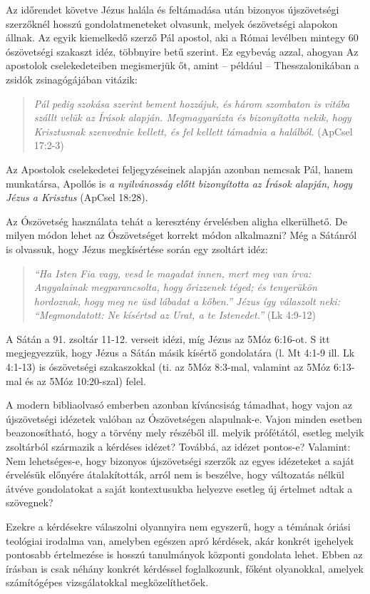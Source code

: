 \documentclass{article}
\begin{document}
Az időrendet követve Jézus halála és feltámadása után bizonyos újszövetségi szerzőknél hosszú gondolatmeneteket olvasunk,
melyek ószövetségi alapokon állnak. Az egyik kiemelkedő szerző Pál apostol, aki a Római levélben
mintegy 60 ószövetségi szakaszt idéz, többnyire betű szerint. Ez egybevág azzal, ahogyan
Az apostolok cselekedeteiben megismerjük őt, amint -- például -- Thesszalonikában a zsidók zsinagógájában
vitázik:
\begin{quote}
\textit{Pál pedig szokása szerint bement hozzájuk, és három szombaton is vitába
szállt velük az Írások alapján. Megmagyarázta és bizonyította nekik, hogy
Krisztusnak szenvednie kellett, és fel kellett támadnia a halálból.} (ApCsel 17:2-3)
\end{quote}
Az Apostolok cselekedetei feljegyzéseinek alapján azonban nemcsak Pál, hanem munkatársa,
Apollós is \textit{a nyilvánosság előtt bizonyította az Írások alapján, hogy Jézus a Krisztus}
(ApCsel 18:28). 

Az Ószövetség használata tehát a keresztény érvelésben aligha elkerülhető. De milyen módon lehet
az Ószövetséget korrekt módon alkalmazni? Még a Sátánról is olvassuk, hogy Jézus megkísértése
során egy zsoltárt idéz: 
\begin{quote}
\textit{``Ha Isten Fia vagy, vesd le magadat innen, mert meg van írva:
Angyalainak megparancsolta, hogy őrizzenek téged; 
és tenyerükön hordoznak, hogy meg ne üsd lábadat a kőben.''
Jézus így válaszolt neki: ``Megmondatott: Ne kísértsd az Urat, a te Istenedet.''} (Lk 4:9-12)
\end{quote}
A Sátán a 91. zsoltár 11-12. verseit idézi, míg Jézus az 5Móz 6:16-ot. S itt megjegyezzük,
hogy Jézus a Sátán másik kísértő gondolatára (l. Mt 4:1-9 ill. Lk 4:1-13) is ószövetségi szakaszokkal
(ti. az 5Móz 8:3-mal, valamint az 5Móz 6:13-mal és az 5Móz 10:20-szal) felel.

A modern bibliaolvasó emberben azonban kíváncsiság támadhat, hogy vajon az újszövetségi idézetek
valóban az Ószövetségen alapulnak-e. Vajon minden esetben beazonosítható, hogy a törvény mely
részéből ill. melyik prófétától, esetleg melyik zsoltárból származik a kérdéses idézet?
Továbbá, az idézet pontos-e? Valamint: Nem lehetséges-e, hogy bizonyos újszövetségi szerzők az egyes
idézeteket a saját érvelésük előnyére átalakították, arról nem is beszélve, hogy változatás
nélkül átvéve gondolatokat a saját kontextusukba helyezve esetleg új értelmet adtak a szövegnek?

Ezekre a kérdésekre válaszolni olyannyira nem egyszerű, hogy a témának óriási teológiai irodalma
van, amelyben egészen apró kérdések, akár konkrét igehelyek pontosabb értelmezése is
hosszú tanulmányok központi gondolata lehet. Ebben az írásban is csak néhány konkrét kérdéssel
foglalkozunk, főként olyanokkal, amelyek számítógépes vizsgálatokkal megközelíthetőek.
\end{document}
